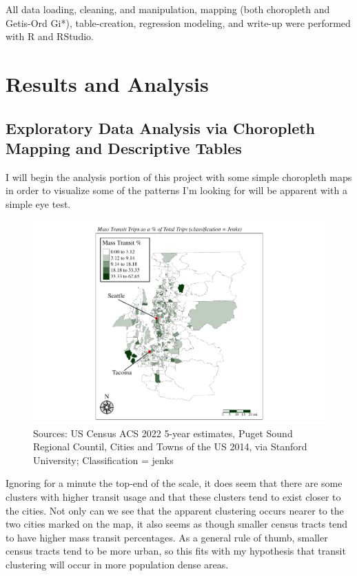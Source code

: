 \documentclass[
]{article}
\begin{document}
All data loading, cleaning, and manipulation, mapping (both choropleth
and Getis-Ord Gi*), table-creation, regression modeling, and write-up
were performed with R and RStudio.

\newpage

\section{Results and Analysis}\label{results-and-analysis}

\subsection{Exploratory Data Analysis via Choropleth Mapping and
Descriptive
Tables}\label{exploratory-data-analysis-via-choropleth-mapping-and-descriptive-tables}

I will begin the analysis portion of this project with some simple
choropleth maps in order to visualize some of the patterns I'm looking
for will be apparent with a simple eye test.

\begin{figure}
\centering
\includegraphics{truncated_transit_hotspots_paper_files/figure-latex/unnamed-chunk-3-1.pdf}
\caption{Sources: US Census ACS 2022 5-year estimates, Puget Sound
Regional Countil, Cities and Towns of the US 2014, via Stanford
University; Classification = jenks}
\end{figure}

Ignoring for a minute the top-end of the scale, it does seem that there
are some clusters with higher transit usage and that these clusters tend
to exist closer to the cities. Not only can we see that the apparent
clustering occurs nearer to the two cities marked on the map, it also
seems as though smaller census tracts tend to have higher mass transit
percentages. As a general rule of thumb, smaller census tracts tend to
be more urban, so this fits with my hypothesis that transit clustering
will occur in more population dense areas.
\end{document}

